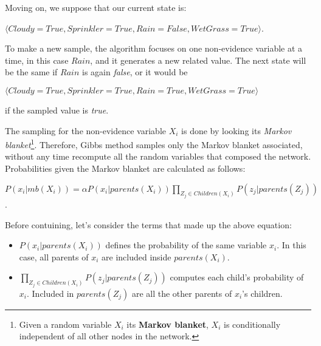 Moving on, we suppose that our current state is:
\begin{center} \vspace{3.5pt}
    $\langle Cloudy=True, Sprinkler=True, Rain=False, WetGrass=True \rangle$.
\end{center} \vspace{3.5pt}
To make a new sample, the algorithm focuses on one non-evidence variable at a time, in this case $Rain$, and it generates a new related value. The next state will be the same if $Rain$
is again \textit{false}, or it would be 
\begin{center} \vspace{3.5pt}
    $\langle Cloudy=True, Sprinkler=True, Rain=True, WetGrass=True \rangle$
\end{center} \vspace{3.5pt}
if the sampled value is \textit{true}. 
\begin{center}
\end{center} \vspace{3.5pt}
The sampling for the non-evidence variable $X_i$ is done by looking its \textit{Markov blanket}\footnote{Given a random variable $X_i$ its \textbf{Markov blanket}, $X_i$ is conditionally independent of all other nodes in the network.}.
Therefore, Gibbs method samples only the Markov blanket associated, without any time recompute all the random variables that composed the network. Probabilities given the Markov
blanket are calculated as follows: \vspace{3.5pt}
\begin{center}
    $P(x_i|mb(X_i)) = \alpha P(x_i|parents(X_i))\prod_{Z_j \in Children(X_i)}P(z_j|parents(Z_j))$.
\end{center} \vspace{3.5pt}
Before contuining, let's consider the terms that made up the above equation:
\begin{itemize}
    \renewcommand{\labelitemi}{-}
    \item $P(x_i|parents(X_i))$ defines the probability of the same variable $x_i$. In this case, all parents of $x_i$ are included inside $parents(X_i)$.  
    \item $\prod_{Z_j \in Children(X_i)}P(z_j|parents(Z_j))$ computes each child's probability of $x_i$. Included in $parents(Z_j)$ are all the other parents of $x_i$'s children.
\end{itemize}
